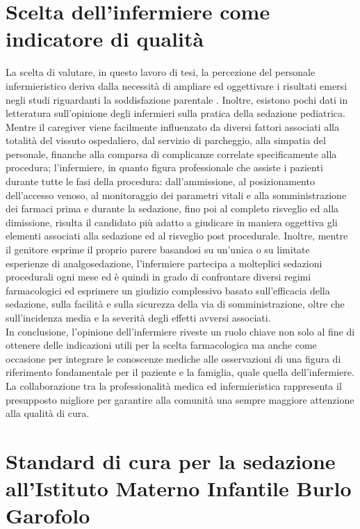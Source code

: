 \section{Scelta dell'infermiere come indicatore di qualità}

La scelta di valutare, in questo lavoro di tesi, la percezione del personale infermieristico deriva dalla necessità di ampliare ed oggettivare i risultati emersi negli studi riguardanti la soddisfazione parentale \cite{Cortellazzo2022, Lew2010, Connor2014}. Inoltre, esistono pochi dati in letteratura sull'opinione degli infermieri sulla pratica della sedazione pediatrica.\\
Mentre il caregiver viene facilmente influenzato da diversi fattori associati alla totalità del vissuto ospedaliero, dal servizio di parcheggio, alla simpatia del personale, finanche alla comparsa di complicanze correlate specificamente alla procedura; l'infermiere, in quanto figura professionale che assiste i pazienti durante tutte le fasi della procedura: dall'ammissione, al posizionamento dell'accesso venoso, al monitoraggio dei parametri vitali e alla somministrazione dei farmaci prima e durante la sedazione, fino poi al completo risveglio ed alla dimissione, risulta il candidato più adatto a giudicare in maniera oggettiva gli elementi associati alla sedazione ed al risveglio post procedurale. Inoltre, mentre il genitore esprime il proprio parere basandosi su un'unica o su limitate esperienze di analgosedazione, l'infermiere partecipa a molteplici sedazioni procedurali ogni mese ed è quindi in grado di confrontare diversi regimi farmacologici ed esprimere un giudizio complessivo basato sull'efficacia della sedazione, sulla facilità e sulla sicurezza della via di somministrazione, oltre che sull'incidenza media e la severità degli effetti avversi associati.
\\In conclusione, l'opinione dell'infermiere riveste un ruolo chiave non solo al fine di ottenere delle indicazioni utili per la scelta farmacologica ma anche come occasione per integrare le conoscenze mediche alle osservazioni di una figura di riferimento fondamentale per il paziente e la famiglia, quale quella dell'infermiere. La collaborazione tra la professionalità medica ed infermieristica rappresenta il presupposto migliore per garantire alla comunità una sempre maggiore attenzione alla qualità di cura. 

\section{Standard di cura per la sedazione all'Istituto Materno Infantile Burlo Garofolo}

